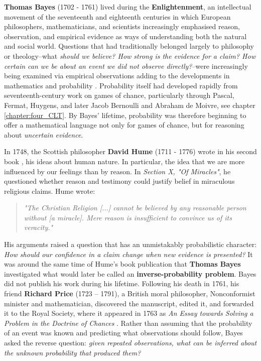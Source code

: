 \textbf{Thomas Bayes} (1702 - 1761) lived during the \textbf{Enlightenment}, an intellectual movement of the seventeenth and eighteenth centuries in which European philosophers, mathematicians, and scientists increasingly emphasised reason, observation, and empirical evidence as ways of understanding both the natural and social world. Questions that had traditionally belonged largely to philosophy or theology--what\textit{ should we believe? How strong is the evidence for a claim? How certain can we be about an event we did not observe directly?}--were increasingly being examined via empirical observations adding to the developments in mathematics and probability \cite{hacking1975,stigler1986}. Probability itself had developed rapidly from seventeenth-century work on games of chance, particularly through Pascal, Fermat, Huygens, and later Jacob Bernoulli and Abraham de Moivre, see chapter \ref{chapter:four_CLT}. By Bayes' lifetime, probability was therefore beginning to offer a mathematical language not only for games of chance, but for reasoning about \textit{uncertain evidence}.

In 1748, the Scottish philosopher \textbf{David Hume} (1711 - 1776) wrote in his second book \cite{hume1748enquiry}, his ideas about human nature. In particular, the idea that we are more influenced by our feelings than by reason. In \textit{Section X, "Of Miracles"}, he questioned whether reason and testimony could justify belief in miraculous religious claims. Hume wrote:

\begin{quote}
\itshape
"The \textit{Christian Religion} [...] cannot be believed by any reasonable person without [a miracle]. Mere reason is insufficient to convince us of its veracity."
\cite{hume1748enquiry}
\end{quote}

His arguments raised a question that has an unmistakably probabilistic character: \textit{How should our confidence in a claim change when new evidence is presented?} It was around the same time of Hume's book publication that \textbf{Thomas Bayes} investigated what would later be called an \textbf{inverse-probability problem}. Bayes did not publish his work during his lifetime. Following his death in 1761, his friend \textbf{Richard Price} (1723 – 1791), a British moral philosopher, Nonconformist minister and mathematician, discovered the manuscript, edited it, and forwarded it to the Royal Society, where it appeared in 1763 as \textit{An Essay towards Solving a Problem in the Doctrine of Chances} \cite{bayes1763essay}. Rather than assuming that the probability of an event was known and predicting what observations should follow, Bayes asked the reverse question: \textit{given repeated observations, what can be inferred about the unknown probability that produced them?}

